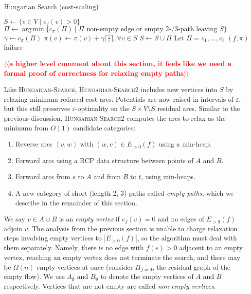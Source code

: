 \documentclass[11pt]{article}
\makeatletter
\def\eps{\varepsilon}
\DeclareMathOperator*{\argmin}{arg\,min}
\theoremstyle{plain}
\def\n@te#1{\textsf{\boldmath \textbf{$\langle\!\langle$#1$\rangle\!\rangle$}}\leavevmode}
\def\note#1{\textcolor{red}{\n@te{#1}}}
\makeatother
\begin{document}
\begin{algorithm}
\caption{Hungarian Search (cost-scaling)}
\begin{algorithmic}[1]
	\State $S \gets \{v \in V \mid e_f(v) > 0\}$
	\Repeat
		\State $\Pi \gets \argmin\{c_\pi(\Pi) \mid \text{$\Pi$ non-empty edge or empty 2-/3-path leaving $S$}\}$
			\label{line:hs_relaxation}
		\State $\gamma \gets c_\pi(\Pi)$
			\State $\pi(v) \gets \pi(v) + \gamma\lceil\frac{\gamma}{\eps}\rceil, \forall v \in S$
		\EndIf
		\State $S \gets S \cup \Pi$
		\Statex %
		\State Let $\Pi = v_1, \ldots, v_\ell$
		 
			\State\Return $(f, \pi)$
		\EndIf
	\State\Return failure
\EndFunction
\end{algorithmic}
\end{algorithm}


\note{a higher level comment about this section, it feels like we need a formal proof of correctness for relaxing empty paths}

Like \textsc{Hungarian-Search}, \textsc{Hungarian-Search2} includes new
vertices into $S$ by relaxing minimum-reduced cost arcs.
Potentials are now raised in intervals of $\eps$, but this still preserves
$\eps$-optimality on the $S \times V \setminus S$ residual arcs.
Similar to the previous discussion, \textsc{Hungarian-Search2} computes the
arcs to relax as the minimum from $O(1)$ candidate categories:
\begin{enumerate}
\item Reverse arcs $(v, w)$ with $(w, v) \in E_{>0}(f)$ using a min-heap.
\item Forward arcs using a BCP data structure between points of $A$ and $B$.
\item Forward arcs from $s$ to $A$ and from $B$ to $t$, using min-heaps.
\item A new category of short (length 2, 3) paths called \emph{empty paths},
	which we describe in the remainder of this section.
\end{enumerate}

We say $v \in A \cup B$ is an \emph{empty vertex} if $e_f(v) = 0$ and no edges
of $E_{>0}(f)$ adjoin $v$.
The analysis from the previous section is unable to charge relaxation steps 
involving empty vertices to $|E_{>0}(f)|$, so the algorithm must deal with them 
separately.
Namely, there is no edge with $f(e) > 0$ adjacent to an empty vertex,
reaching an empty vertex does not terminate the search, and there may be
$\Omega(n)$ empty vertices at once (consider $H_{f = 0}$, the residual graph
of the empty flow).
We use $A_\emptyset$ and $B_\emptyset$ to denote the empty vertices of $A$ and
$B$ respectively.
Vertices that are not empty are called \emph{non-empty vertices}.
\end{document}
